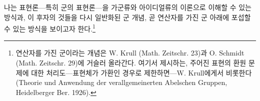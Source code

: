 \documentclass[11pt]{article}
\begin{document}
나는 표현론---특히 군의 표현론---을 가군류와 아이디얼류의 이론으로 이해할 수 있는 방식과, 이 후자의 것들을 다시 일반화된 군 개념, 곧 연산자를 가진 군 아래에 포섭할 수 있는 방식을 보이고자 한다.\footnote{연산자를 가진 군이라는 개념은 W. Krull (Math. Zeitschr. 23)과 O. Schmidt (Math. Zeitschr. 29)에 거슬러 올라간다. 여기서 제시하는, 주어진 표현의 환원 문제에 대한 처리도---표현체가 가환인 경우로 제한하면---W. Krull에게서 비롯한다(Theorie und Anwendung der verallgemeinerten Abelschen Gruppen, Heidelberger Ber. 1926).}
\end{document}
